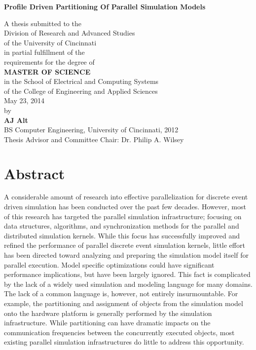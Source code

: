 \documentclass[11pt]{book}
\begin{document}
\thispagestyle{empty}

\doublespacing

\vspace*{0.5in}

\begin{center}
\LARGE{\textbf{Profile Driven Partitioning Of Parallel Simulation Models}}

\vspace*{0.4in}

  {\large A thesis submitted to the\\[0.20in]
    Division of Research and Advanced Studies\\
    of the University of Cincinnati\\[0.20in]
    in partial fulfillment of the\\
    requirements for the degree of\\[0.20in]
    {\bf MASTER OF SCIENCE}\\[0.20in]
    in the School of Electrical and Computing Systems\\
    of the College of Engineering and Applied Sciences\\[0.20in]
    May 23, 2014\\[0.20in]
    by\\[0.20in]
    {\bf AJ Alt}\\
    BS Computer Engineering, University of Cincinnati, 2012\\}
  \vspace{0.5in}
  {\large Thesis Advisor and Committee Chair:  Dr. Philip A. Wilsey}
\end{center}

\clearpage

\setcounter{page}{1}
\clearpage

\chapter*{Abstract} 

A considerable amount of research into effective parallelization for discrete event driven simulation has been conducted over the past few decades. However, most of this research has targeted the parallel simulation infrastructure; focusing on data structures, algorithms, and synchronization methods for the parallel and distributed simulation kernels. While this focus has successfully improved and refined the performance of parallel discrete event simulation kernels, little effort has been directed toward analyzing and preparing the simulation model itself for parallel execution. Model specific optimizations could have significant performance implications, but have been largely ignored. This fact is complicated by the lack of a widely used simulation and modeling language for many domains. The lack of a common language is, however, not entirely insurmountable. For example, the partitioning and assignment of objects from the simulation model onto the hardware platform is generally performed by the simulation infrastructure. While partitioning can have dramatic impacts on the communication frequencies between the concurrently executed objects, most existing parallel simulation infrastructures do little to address this opportunity.
\end{document}

